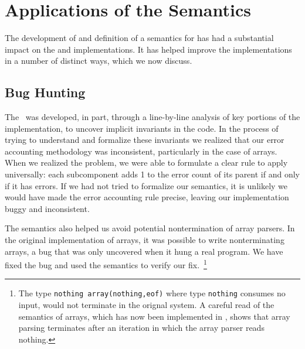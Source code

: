 \section{Applications of the Semantics}
\label{sec:applications}

The development of \ddc{} and definition of a semantics for \ipads{}
has had a substantial impact on the \padsc{} and \padsml{}
implementations. It has helped improve the implementations in a number
of distinct ways, which we now discuss.

\subsection{Bug Hunting}

The \ddc\ was developed, in part, through a line-by-line analysis of key
portions of the \padsc{} implementation, to uncover implicit invariants in
the code.  In the process of trying to understand and formalize these
invariants we realized that our error accounting methodology was
inconsistent, particularly in the case of arrays.  When we realized
the problem, we were able to formulate a clear rule to apply
universally: each subcomponent adds 1 to the error count of its parent
if and only if it has errors.  If we had not tried to formalize our
semantics, it is unlikely we would have made the error accounting rule
precise, leaving our implementation buggy and inconsistent.

The semantics also helped us avoid potential nontermination of array
parsers. In the original implementation of \padsc{} arrays, it was
possible to write nonterminating arrays, a bug that was only
uncovered when it hung a real program.  We have fixed the bug and used
the semantics to verify our fix.~\footnote{The type {\tt nothing
    array(nothing,eof)} where type {\tt nothing} consumes no input,
  would not terminate in the orignal system.  A careful read of the
  \ddc{} semantics of arrays, which has now been implemented in
  \padsc{}, shows that array parsing terminates after an iteration in
  which the array parser reads nothing.}



